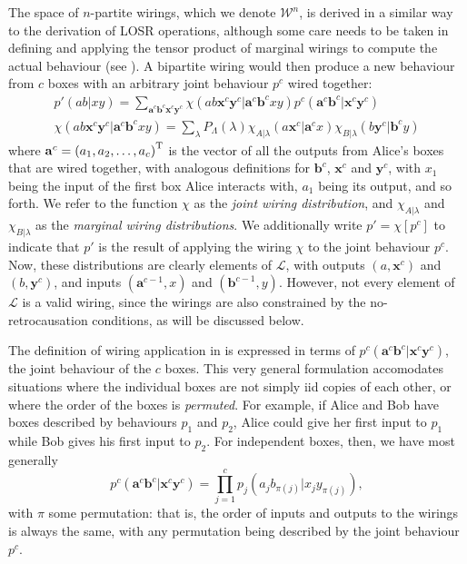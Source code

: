 \documentclass[10pt, a4paper]{article}
\numberwithin{equation}{section} %
\theoremstyle{definition}
\theoremstyle{plain}
\newcommand{\?}{\mathrel{?}} %
\newcommand{\cvec}[1]{\boldsymbol{\mathbf{#1}}}    %
\newcommand{\sW}{\mathcal{W}}
\newcommand{\Ls}{\mathcal{L}}
\begin{document}
              The space of \(n\)-partite wirings, which we denote \(\sW^n\), is derived in a similar way to the derivation of LOSR operations, although some care needs to be taken in defining and applying the tensor product of marginal wirings to compute the actual behaviour (see ). A bipartite wiring would then produce a new behaviour from \(c\) boxes with an arbitrary joint behaviour \(p^c\) wired together:
              \begin{gather}
                p'(ab|xy) = \sum_{\cvec{a}^c\cvec{b}^c\cvec{x}^c\cvec{y}^c} \chi(ab\cvec{x}^c\cvec{y}^c|\cvec{a}^c\cvec{b}^cxy) p^c(\cvec{a}^c\cvec{b}^c|\cvec{x}^c\cvec{y}^c)\label{eqn:jwirdistdef} \\
                \chi(ab\cvec{x}^c\cvec{y}^c|\cvec{a}^c\cvec{b}^cxy) = \sum_{\lambda} P_{\Lambda}(\lambda) \chi_{A|\lambda}(a\cvec{x}^c|\cvec{a}^cx) \chi_{B|\lambda}(b\cvec{y}^c|\cvec{b}^cy) \label{eqn:mwirdistdef}
              \end{gather}
              where \(\cvec{a}^c = {(a_1, a_2, \ldots, a_c)}^{\rm T}\) is the vector of all the outputs from Alice's boxes that are wired together, with analogous definitions for \(\cvec{b}^c\), \(\cvec{x}^c\) and \(\cvec{y}^c\), with \(x_1\) being the input of the first box Alice interacts with, \(a_1\) being its output, and so forth. We refer to the function \(\chi\) as the \emph{joint wiring distribution}, and \(\chi_{A|\lambda}\) and \(\chi_{B|\lambda}\) as the \emph{marginal wiring distributions}. We additionally write \(p' = \chi[p^c]\) to indicate that \(p'\) is the result of applying the wiring \(\chi\) to the joint behaviour \(p^c\). Now, these distributions are clearly elements of \(\Ls\), with outputs \((a, \cvec{x}^c)\) and \((b, \cvec{y}^c)\), and inputs \((\cvec{a}^{c-1}, x)\) and \((\cvec{b}^{c-1}, y)\). However, not every element of \(\Ls\) is a valid wiring, since the wirings are also constrained by the no-retrocausation conditions, as will be discussed below.

                The definition of wiring application in  is expressed in terms of \(p^c(\cvec{a}^c\cvec{b}^c|\cvec{x}^c\cvec{y}^c)\), the joint behaviour of the \(c\) boxes. This very general formulation accomodates situations where the individual boxes are not simply iid copies of each other, or where the order of the boxes is \emph{permuted}. For example, if Alice and Bob have boxes described by behaviours \(p_1\) and \(p_2\), Alice could give her first input to \(p_1\) while Bob gives his first input to \(p_2\). For independent boxes, then, we have most generally
                  \begin{equation}
                     p^c(\cvec{a}^c\cvec{b}^c|\cvec{x}^c\cvec{y}^c) = \prod_{j=1}^c p_j(a_jb_{\pi(j)}|x_jy_{\pi(j)}),
                  \end{equation}
                  with \(\pi\) some permutation: that is, the order of inputs and outputs to the wirings is always the same, with any permutation being described by the joint behaviour \(p^c\).
\end{document}
